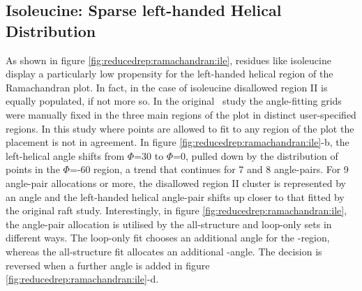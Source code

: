 \subsection{Isoleucine: Sparse left-handed Helical Distribution}

As shown in figure \ref{fig:reducedrep:ramachandran:ile}, residues like isoleucine display a particularly low propensity for the left-handed helical region of the Ramachandran plot. In fact, in the case of isoleucine disallowed region II is equally populated, if not more so. In the original \raft\ study the angle-fitting grids were manually fixed in the three main regions of the plot in distinct user-specified regions. In this study where points are allowed to fit to any region of the plot the placement is not in agreement. In figure \ref{fig:reducedrep:ramachandran:ile}-b, the left-helical angle shifts from $\Phi$=30 to $\Phi$=0, pulled down by the distribution of points in the $\Phi$=-60 region, a trend that continues for 7 and 8 angle-pairs. For 9 angle-pair allocations or more, the disallowed region II cluster is represented by an angle and the left-handed helical angle-pair shifts up closer to that fitted by the original raft study.
Interestingly, in figure \ref{fig:reducedrep:ramachandran:ile}, the  angle-pair allocation is utilised by the all-structure and loop-only sets in different ways. The loop-only fit chooses an additional angle for the \al-region, whereas the all-structure fit allocates an additional \be-angle. The decision is reversed when a further angle is added in figure \ref{fig:reducedrep:ramachandran:ile}-d.

